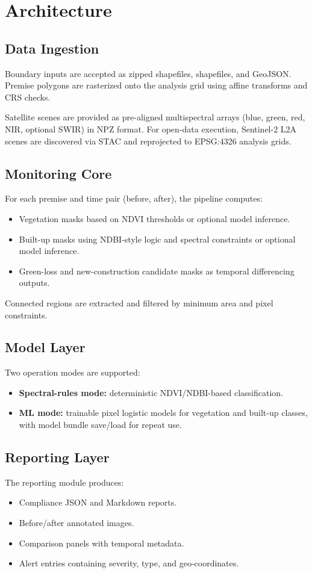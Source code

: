 \documentclass[conference]{IEEEtran}
\begin{document}
\section{Architecture}
\subsection{Data Ingestion}
Boundary inputs are accepted as zipped shapefiles, shapefiles, and GeoJSON. Premise polygons are rasterized onto the analysis grid using affine transforms and CRS checks.

Satellite scenes are provided as pre-aligned multispectral arrays (blue, green, red, NIR, optional SWIR) in NPZ format. For open-data execution, Sentinel-2 L2A scenes are discovered via STAC and reprojected to EPSG:4326 analysis grids.

\subsection{Monitoring Core}
For each premise and time pair (before, after), the pipeline computes:
\begin{itemize}
    \item Vegetation masks based on NDVI thresholds or optional model inference.
    \item Built-up masks using NDBI-style logic and spectral constraints or optional model inference.
    \item Green-loss and new-construction candidate masks as temporal differencing outputs.
\end{itemize}
Connected regions are extracted and filtered by minimum area and pixel constraints.

\subsection{Model Layer}
Two operation modes are supported:
\begin{itemize}
    \item \textbf{Spectral-rules mode:} deterministic NDVI/NDBI-based classification.
    \item \textbf{ML mode:} trainable pixel logistic models for vegetation and built-up classes, with model bundle save/load for repeat use.
\end{itemize}

\subsection{Reporting Layer}
The reporting module produces:
\begin{itemize}
    \item Compliance JSON and Markdown reports.
    \item Before/after annotated images.
    \item Comparison panels with temporal metadata.
    \item Alert entries containing severity, type, and geo-coordinates.
\end{itemize}
\end{document}
